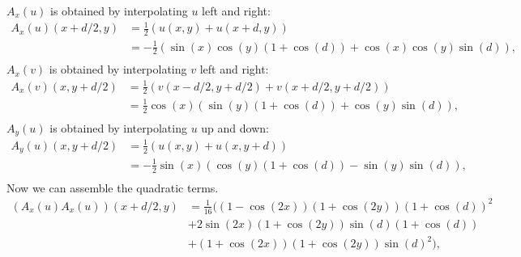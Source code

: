 \documentclass[preprint]{elsarticle}
\begin{document}
$A_x(u)$ is obtained by interpolating $u$ left and right:
\begin{equation}
    \begin{split}
        A_x(u)(x + d / 2, y)
        & = \frac{1}{2} (u(x, y) + u(x + d, y)) \\
        & = - \frac{1}{2} (\sin(x) \cos(y) (1 + \cos(d)) + \cos(x) \cos(y) \sin(d)) , \\
    \end{split}
\end{equation}
$A_x(v)$ is obtained by interpolating $v$ left and right:
\begin{equation}
    \begin{split}
        A_x(v)(x, y + d / 2)
        & = \frac{1}{2} (v(x - d / 2, y + d / 2) + v(x + d / 2, y + d / 2)) \\
        & = \frac{1}{2} \cos(x) (\sin(y) (1 + \cos(d)) + \cos(y) \sin(d)) , \\
    \end{split}
\end{equation}
$A_y(u)$ is obtained by interpolating $u$ up and down:
\begin{equation}
    \begin{split}
        A_y(u)(x, y + d / 2)
        & = \frac{1}{2} (u(x, y) + u(x, y + d)) \\
        & = - \frac{1}{2} \sin(x) (\cos(y) (1 + \cos(d)) - \sin(y) \sin(d)) , \\
    \end{split}
\end{equation}
Now we can assemble the quadratic terms.
\begin{equation}
    \begin{split}
        (A_x(u) A_x(u))(x + d / 2, y)
        & = \frac{1}{16}
        (
        (1 - \cos(2 x)) (1 + \cos(2 y)) (1 + \cos(d))^2 \\
        & + 2 \sin(2 x) (1 + \cos(2 y)) \sin(d) (1 + \cos(d)) \\
        & + (1 + \cos(2 x)) (1 + \cos(2 y)) \sin(d)^2
        ), \\
    \end{split}
\end{equation}
\end{document}

